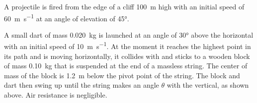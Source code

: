 \documentclass{../../oss-apphys-exam}
\begin{document}
\begin{questions}
  \question A projectile is fired from the edge of a cliff \SI{100}{\metre}
  high with an initial speed of \SI{60}{\metre\per\second} at an angle of
  elevation of \ang{45}.
  \newpage

  \question A small dart of mass \SI{.020}{\kilo\gram} is launched at an angle
  of \ang{30} above the horizontal with an initial speed of
  \SI{10}{\meter\per\second}. At the moment it reaches the highest point in its
  path and is moving horizontally, it collides with and sticks to a wooden
  block of mass \SI{.10}{\kilo\gram} that is suspended at the end of a massless
  string. The center of mass of the block is \SI{1.2}{\metre} below the pivot
  point of the string. The block and dart then swing up until the string makes
  an angle $\theta$ with the vertical, as shown above. Air resistance is
  negligible.
  \begin{parts}

\end{parts}
\end{questions}
\end{document}
